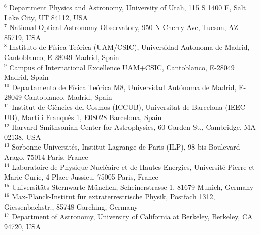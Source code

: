 {\scriptsize $^{6}$ Department Physics and Astronomy, University of Utah, 115 S 1400 E, Salt Lake City, UT 84112, USA\vspace*{-2pt} \\ 
\scriptsize $^{7}$ National Optical Astronomy Observatory, 950 N Cherry Ave, Tucson, AZ 85719, USA\vspace*{-2pt} \\ 
\scriptsize $^{8}$ Instituto de F\'isica Te\'orica (UAM/CSIC), Universidad Autonoma de Madrid, Cantoblanco, E-28049 Madrid, Spain\vspace*{-2pt} \\ 
\scriptsize $^{9}$ Campus of International Excellence UAM+CSIC, Cantoblanco, E-28049 Madrid, Spain\vspace*{-2pt} \\ 
\scriptsize $^{10}$ Departamento de F\'isica Te\'orica M8, Universidad Aut\'onoma de Madrid, E-28049 Cantoblanco, Madrid, Spain\vspace*{-2pt} \\ 
\scriptsize $^{11}$ Institut de Ci\`encies del Cosmos (ICCUB), Universitat de Barcelona (IEEC-UB), Mart\'i i Franqu\`es 1, E08028 Barcelona, Spain\vspace*{-2pt} \\ 
\scriptsize $^{12}$ Harvard-Smithsonian Center for Astrophysics, 60 Garden St., Cambridge, MA 02138, USA\vspace*{-2pt} \\ 
\scriptsize $^{13}$ Sorbonne Universit\'es, Institut Lagrange de Paris (ILP), 98 bis Boulevard Arago, 75014 Paris, France\vspace*{-2pt} \\ 
\scriptsize $^{14}$ Laboratoire de Physique Nucl\'eaire et de Hautes Energies, Universit\'e Pierre et Marie Curie, 4 Place Jussieu, 75005 Paris, France\vspace*{-2pt} \\ 
\scriptsize $^{15}$ Universit\"ats-Sternwarte M\"unchen, Scheinerstrasse 1, 81679 Munich, Germany\vspace*{-2pt} \\ 
\scriptsize $^{16}$ Max-Planck-Institut f\"ur extraterrestrische Physik, Postfach 1312, Giessenbachstr., 85748 Garching, Germany\vspace*{-2pt} \\ 
\scriptsize $^{17}$ Department of Astronomy, University of California at Berkeley, Berkeley, CA 94720, USA\vspace*{-2pt} \\ 
}
